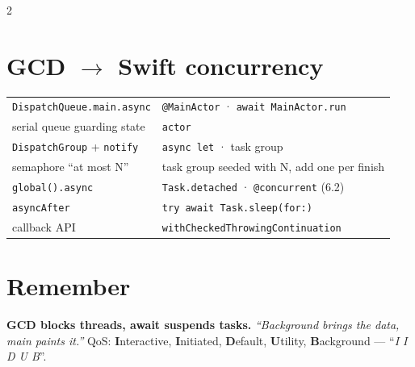 \documentclass[8pt]{extarticle}
\begin{document}
\begin{multicols}{2}
\section{GCD $\to$ Swift concurrency}
{\footnotesize
\begin{tabular}{@{}l l@{}}
\toprule
\texttt{DispatchQueue.main.async} & \texttt{@MainActor} · \texttt{await MainActor.run} \\
serial queue guarding state & \texttt{actor} \\
\texttt{DispatchGroup} + \texttt{notify} & \texttt{async let} · task group \\
semaphore ``at most N'' & task group seeded with N, add one per finish \\
\texttt{global().async} & \texttt{Task.detached} · \texttt{@concurrent} (6.2) \\
\texttt{asyncAfter} & \texttt{try await Task.sleep(for:)} \\
callback API & \texttt{withCheckedThrowingContinuation} \\
\bottomrule
\end{tabular}}

\section{Remember}
\textbf{GCD blocks threads, await suspends tasks.} \emph{``Background
brings the data, main paints it.''} QoS: \textbf{I}nteractive,
\textbf{I}nitiated, \textbf{D}efault, \textbf{U}tility, \textbf{B}ackground —
``\emph{I I D U B}''.


\end{multicols}

\end{document}
